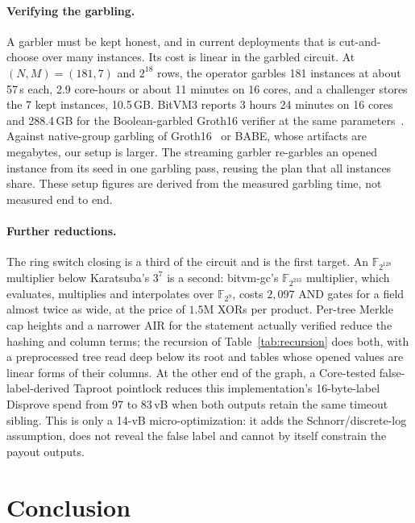 \documentclass[11pt]{article}
\newcommand{\F}{\mathbb{F}_{2^{128}}}
\newcommand{\AND}{\textsf{AND}}
\newcommand{\XOR}{\textsf{XOR}}
\begin{document}
\paragraph{Verifying the garbling.} A garbler must be kept honest, and in
current deployments that is cut-and-choose over many instances. Its cost is
linear in the garbled circuit. At $(N,M)=(181,7)$ and $2^{18}$ rows, the
operator garbles 181 instances at about 57\,s each, 2.9 core-hours or about
11 minutes on 16 cores, and a challenger stores the 7 kept instances, 10.5\,GB.
BitVM3 reports 3 hours 24 minutes on 16 cores and 288.4\,GB for the
Boolean-garbled Groth16 verifier at the same parameters~\cite{bitvm3paper}.
Against native-group garbling of Groth16~\cite{kflt26native} or BABE, whose
artifacts are megabytes, our setup is larger. The streaming garbler re-garbles
an opened instance from its seed in one garbling pass, reusing the plan that all
instances share. These setup figures are derived from the measured garbling time,
not measured end to end.

\paragraph{Further reductions.} The ring switch closing is a third of the
circuit and is the first target. An $\F$ multiplier below Karatsuba's
$3^7$ is a second: bitvm-gc's $\mathbb{F}_{2^{233}}$ multiplier, which evaluates,
multiplies and interpolates over $\mathbb{F}_{2^9}$, costs $2{,}097$ \AND{} gates
for a field almost twice as wide, at the price of $1.5$M \XOR{}s per product.
Per-tree Merkle cap heights and a narrower AIR for the statement actually
verified reduce the hashing and column terms; the recursion of
Table~\ref{tab:recursion} does both, with a preprocessed tree read deep below its
root and tables whose opened values are linear forms of their columns.
At the other end of the graph, a Core-tested false-label-derived Taproot
pointlock reduces this implementation's 16-byte-label Disprove spend from
97 to 83\,vB when both outputs retain the same timeout sibling. This is only a
14-vB micro-optimization: it adds the Schnorr/discrete-log assumption, does not
reveal the false label and cannot by itself constrain the payout outputs.

\section{Conclusion}
\end{document}
